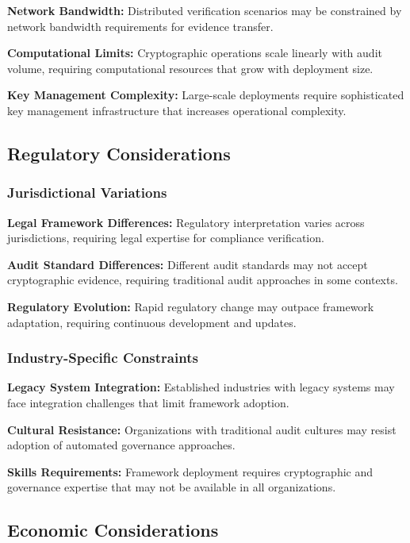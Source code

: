 \documentclass[12pt,a4paper]{article}
\begin{document}
\textbf{Network Bandwidth:} Distributed verification scenarios may be constrained by network bandwidth requirements for evidence transfer.

\textbf{Computational Limits:} Cryptographic operations scale linearly with audit volume, requiring computational resources that grow with deployment size.

\textbf{Key Management Complexity:} Large-scale deployments require sophisticated key management infrastructure that increases operational complexity.

\subsection{Regulatory Considerations}

\subsubsection{Jurisdictional Variations}

\textbf{Legal Framework Differences:} Regulatory interpretation varies across jurisdictions, requiring legal expertise for compliance verification.

\textbf{Audit Standard Differences:} Different audit standards may not accept cryptographic evidence, requiring traditional audit approaches in some contexts.

\textbf{Regulatory Evolution:} Rapid regulatory change may outpace framework adaptation, requiring continuous development and updates.

\subsubsection{Industry-Specific Constraints}

\textbf{Legacy System Integration:} Established industries with legacy systems may face integration challenges that limit framework adoption.

\textbf{Cultural Resistance:} Organizations with traditional audit cultures may resist adoption of automated governance approaches.

\textbf{Skills Requirements:} Framework deployment requires cryptographic and governance expertise that may not be available in all organizations.

\subsection{Economic Considerations}
\end{document}
